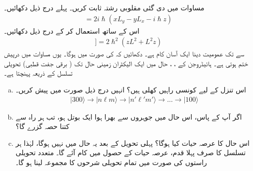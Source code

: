  
 
مساوات  میں دی گئی مقلوبی رشتہ ثابت کریں۔  پہلے درج ذیل دکھائیں۔
\begin{align*}
	[L^2, z] = 2i\hslash(xL_y-yL_x-i\hslash z)
\end{align*}
اس کے ساتھ  استعمال کر کے درج ذیل دکھائیں۔
\begin{align*}
[L^2, [L^2, z]] = 2\hslash^2(zL^2+L^2z)	
\end{align*}
 سے  تک عمومیت دینا ایک آسان کام ہے۔
دکھائیں کہ  کی صورت میں  ہوگا۔ یوں مساوات  میں درپیش  ختم ہوتی ہے۔
ہائیڈروجن کے ، ،  حال میں ایک الیکٹران زمینی حال تک ( برقی جفت قطبی) تحویلی تسلسل کے ذریعہ پہنچتا ہے۔
\begin{enumerate}[a.]
\item
 اس تنزل کے لیے کونسی راہیں کھلی ہیں؟ انہیں درج ذیل صورت میں پیش کریں۔
\begin{align*}
	|300\rangle\to | n\ell m\rangle\to | n'\ell'm'\rangle\to\dots\to|100\rangle
\end{align*}
\item
 اگر آپ کے پاس، اس حال میں جوہروں سے بھرا ہوا ایک بوتل ہو، تب ہر راہ سے کتنا حصہ گزرے گا؟
\item
 اس حال کا عرصہ حیات کیا ہوگا؟  پہلی تحویل کے بعد یہ حال  میں نہیں ہوگا، لہٰذا ہر تسلسل کا صرف پہلا قدم، عرصہ حیات کے حصول میں کام آئے گا۔ متعدد تحویلی راستوں کی صورت میں تمام تحویلی شرحوں کا مجموعہ لینا ہو گا۔
 \end{enumerate}

